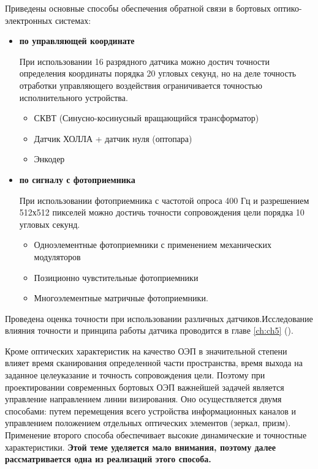 Приведены основные способы обеспечения обратной связи в бортовых оптико-электронных системах:
\begin{itemize}
	\item \textbf{по управляющей координате}
	
	При использовании 16 разрядного датчика можно достич точности определения координаты порядка 20 угловых секунд, но на деле точность отработки управляющего воздействия ограничивается точностью исполнительного устройства.
	
	\begin{itemize}
		\item СКВТ (Синусно-косинусный вращающийся трансформатор)
		\item Датчик ХОЛЛА + датчик нуля (оптопара)
		\item Энкодер
	\end{itemize}
		
	\item \textbf{по сигналу с фотоприемника} 
	
	При использовании фотоприемника с частотой опроса 400 Гц и разрешением 512х512 пикселей можно достичь точности сопровождения цели порядка 10 угловых секунд.
	
	\begin{itemize}
		\item Одноэлементные фотоприемники с применением механических модуляторов
		\item Позиционно чувстительные фотоприемники		
		\item Многоэлементные матричные фотоприемники.	
	\end{itemize}
	
	
\end{itemize}
Проведена оценка точности при использовании различных датчиков.Исследование влияния точности и принципа работы датчика проводится в главе \ref{ch:ch5} ().

Кроме оптических характеристик на качество ОЭП в значительной степени влияет время сканирования определенной части пространства, время выхода на заданное целеуказание и точность сопровождения цели. Поэтому при проектировании современных бортовых ОЭП важнейшей задачей является управление направлением линии визирования. Оно осуществляется двумя способами: путем перемещения всего устройства информационных каналов и управлением положением отдельных оптических элементов (зеркал, призм). Применение второго способа обеспечивает высокие динамические и точностные характеристики. \textbf{Этой теме уделяется мало внимания, поэтому далее рассматривается одна из реализаций этого способа.}

